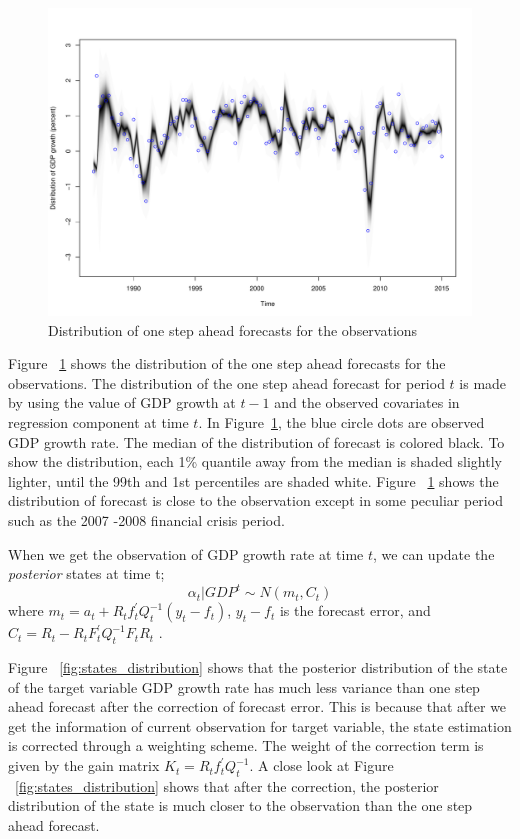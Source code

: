 \begin{figure}[ht]
	\centering
	\includegraphics[width=0.6\linewidth]{Figures/forecast_distribution}
	\caption{Distribution of one step ahead forecasts for the observations}
	\label{fig:forecast_distribution}
\end{figure}



Figure  ~\ref{fig:forecast_distribution} shows the distribution of the one step ahead forecasts for the observations. The distribution of the one step ahead forecast for period $t$ is  made by using the value of GDP growth at $t-1$ and the observed covariates in regression component at time $t$. In Figure~\ref{fig:forecast_distribution}, the blue circle dots are observed GDP growth rate. The median of the distribution of forecast is colored black. To show the distribution, each 1\% quantile away from the median is shaded slightly lighter, until the 99th and 1st percentiles are shaded white. Figure  ~\ref{fig:forecast_distribution} shows the distribution of forecast is close to the observation except in some peculiar period such as the 2007 -2008 financial crisis period.




When we get the observation of GDP growth rate at time $t$, we can update the \textit{posterior} states at time t; 
$$ \alpha_t|GDP^t \sim N(m_t, C_t) $$ 
where $m_t =  a_t + R_t  f_t^\prime Q_t^{-1} (y_t - f_t)$, $y_t - f_t$ is the forecast error, and $C_t = R_t - R_t F_t^\prime Q_t^{-1} F_t R_t$ \cite{Petris2008}.


Figure  ~\ref{fig:states_distribution} shows that the posterior distribution of the state of the target variable GDP growth rate has much less variance than one step ahead forecast after the correction of forecast error. This is because that after we get the information of current observation for target variable, the state estimation is corrected through a weighting scheme.  The weight of the correction term is given by the gain matrix $K_t = R_t  f_t^\prime Q_t^{-1}$. A close look at Figure  ~\ref{fig:states_distribution} shows that after the correction, the posterior distribution of  the state is much closer to the observation than the one step ahead forecast.   


